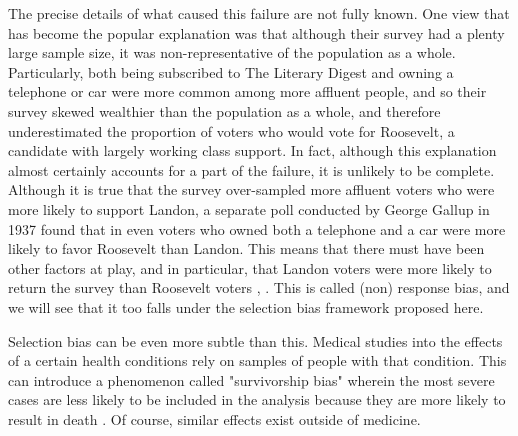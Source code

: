 \documentclass[12pt,twoside]{reedthesis}
\theoremstyle{definition}
\begin{document}
The precise details of what caused this failure are not fully known. One view that has become the popular explanation was that although their survey had a plenty large sample size, it was non-representative of the population as a whole. Particularly, both being subscribed to The Literary Digest and owning a telephone or car were more common among more affluent people, and so their survey skewed wealthier than the population as a whole, and therefore underestimated the proportion of voters who would vote for Roosevelt, a candidate with largely working class support. In fact, although this explanation almost certainly accounts for a part of the failure, it is unlikely to be complete. Although it is true that the survey over-sampled more affluent voters who were more likely to support Landon, a separate poll  conducted by George Gallup in 1937 found that in even voters who owned both a telephone and a car were more likely to favor Roosevelt than Landon. This means that there must have been other factors at play, and in particular, that Landon voters were more likely to return the survey than Roosevelt voters \citep{Squire1988}, \cite{lusinchi_2012}. This is called (non) response bias, and we will see that it too falls under the selection bias framework proposed here.

Selection bias can be even more subtle than this. Medical studies into the effects of a certain health conditions rely on samples of people with that condition. This can introduce a phenomenon called "survivorship bias" wherein the most severe cases are less likely to be included in the analysis because they are more likely to result in death \citep{Delgado_2008}. Of course, similar effects exist outside of medicine. 
\end{document}
